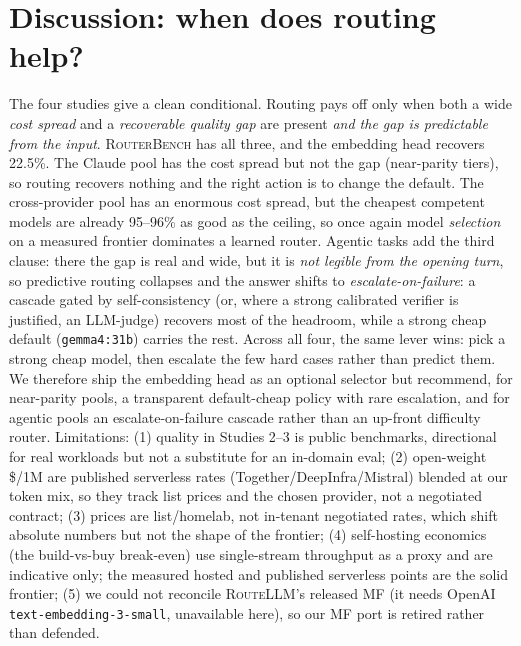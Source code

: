 \documentclass[11pt]{article}
\newcommand{\rb}{\textsc{RouterBench}}
\newcommand{\rl}{\textsc{RouteLLM}}
\newcommand{\code}[1]{\texttt{\small #1}}
\begin{document}
\section{Discussion: when does routing help?}
\label{sec:disc}
The four studies give a clean conditional. Routing pays off only when both a wide
\emph{cost spread} and a \emph{recoverable quality gap} are present \emph{and the gap is
predictable from the input}. \rb{} has all three, and the embedding head recovers 22.5\%. The
Claude pool has the cost spread but not the gap (near-parity tiers), so routing recovers nothing
and the right action is to change the default. The cross-provider pool has an enormous cost
spread, but the cheapest competent models are already 95--96\% as good as the ceiling, so once
again model \emph{selection} on a measured frontier dominates a learned router. Agentic tasks add
the third clause: there the gap is real and wide, but it is \emph{not legible from the opening
turn}, so predictive routing collapses and the answer shifts to \emph{escalate-on-failure}: a
cascade gated by self-consistency (or, where a strong calibrated verifier is justified, an
LLM-judge) recovers most of the headroom, while a strong cheap default (\code{gemma4:31b}) carries
the rest. Across all four, the same lever wins: pick a strong cheap model, then escalate the few
hard cases rather than predict them. We therefore ship the embedding head as an optional selector
but recommend, for near-parity pools, a transparent default-cheap policy with rare escalation, and
for agentic pools an escalate-on-failure cascade rather than an up-front difficulty router.
Limitations: (1) quality in Studies 2--3 is public
benchmarks, directional for real workloads but not a substitute for an in-domain eval;
(2) open-weight \$/1M are published serverless rates (Together/DeepInfra/Mistral) blended at our
token mix, so they track list prices and the chosen provider, not a negotiated contract;
(3) prices are list/homelab, not in-tenant negotiated rates, which shift absolute numbers
but not the shape of the frontier; (4) self-hosting economics (the build-vs-buy break-even) use
single-stream throughput as a proxy and are indicative only; the measured hosted and published
serverless points are the solid frontier; (5) we could not reconcile \rl{}'s released MF (it needs OpenAI
\code{text-embedding-3-small}, unavailable here), so our MF port is retired rather than
defended.
\end{document}
